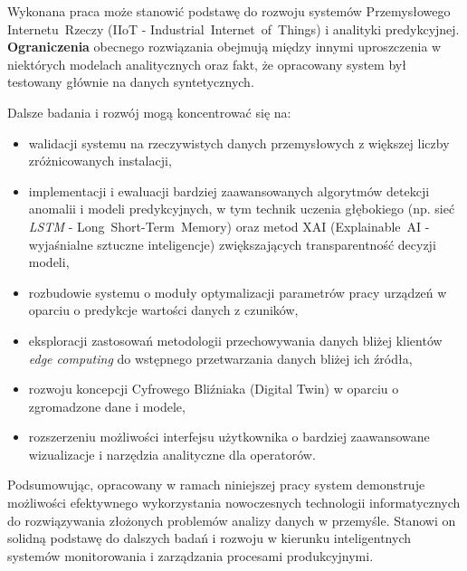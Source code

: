 \vspace{0.3em}

Wykonana praca może stanowić podstawę do rozwoju systemów Przemysłowego \mbox{Internetu Rzeczy} (\mbox{IIoT} - \mbox{Industrial Internet of Things}) i analityki predykcyjnej. \textbf{Ograniczenia} obecnego rozwiązania obejmują między innymi uproszczenia w niektórych modelach analitycznych oraz fakt, że opracowany system był testowany głównie na danych syntetycznych. 

\vspace{0.3em}

Dalsze badania i rozwój mogą koncentrować się na:
\begin{itemize}
    \item walidacji systemu na rzeczywistych danych przemysłowych z większej liczby zróżnicowanych instalacji,
    \item implementacji i ewaluacji bardziej zaawansowanych algorytmów detekcji anomalii i modeli predykcyjnych, w tym technik uczenia głębokiego (np. sieć \textit{LSTM} - \mbox{Long Short-Term Memory}) oraz metod \mbox{XAI} (\mbox{Explainable AI} - wyjaśnialne sztuczne inteligencje) zwiększających transparentność decyzji modeli,
    \item rozbudowie systemu o moduły optymalizacji parametrów pracy urządzeń w oparciu o predykcje wartości danych z czuników,
    \item eksploracji zastosowań metodologii przechowywania danych bliżej klientów \textit{edge computing} do wstępnego przetwarzania danych bliżej ich źródła,
    \item rozwoju koncepcji Cyfrowego Bliźniaka (Digital Twin) w oparciu o zgromadzone dane i modele,
    \item rozszerzeniu możliwości interfejsu użytkownika o bardziej zaawansowane wizualizacje i narzędzia analityczne dla operatorów.
\end{itemize}

\vspace{0.3em}

Podsumowując, opracowany w ramach niniejszej pracy system demonstruje możliwości efektywnego wykorzystania nowoczesnych technologii informatycznych do rozwiązywania złożonych problemów analizy danych w przemyśle. Stanowi on solidną podstawę do dalszych badań i rozwoju w kierunku inteligentnych systemów monitorowania i zarządzania procesami produkcyjnymi. 